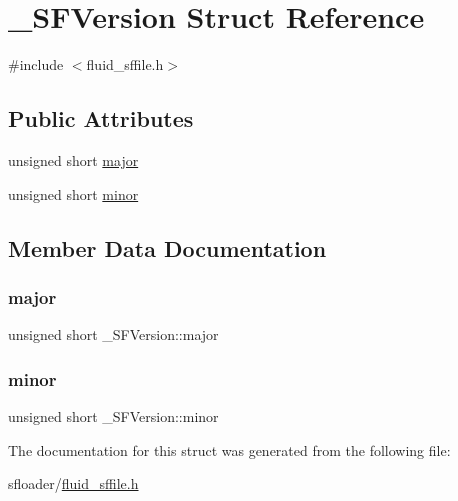 \hypertarget{struct__SFVersion}{}\section{\+\_\+\+S\+F\+Version Struct Reference}
\label{struct__SFVersion}


{\ttfamily \#include $<$fluid\+\_\+sffile.\+h$>$}

\subsection*{Public Attributes}
\begin{DoxyCompactItemize}
\item 
unsigned short \hyperlink{struct__SFVersion_a75680ec3b4b3f16cb131d8b32661723a}{major}
\item 
unsigned short \hyperlink{struct__SFVersion_afbe4dedad275a3d60e290874a5b61113}{minor}
\end{DoxyCompactItemize}


\subsection{Member Data Documentation}
\mbox{\label{struct__SFVersion_a75680ec3b4b3f16cb131d8b32661723a}} 
\subsubsection{\texorpdfstring{major}{major}}
{\footnotesize\ttfamily unsigned short \+\_\+\+S\+F\+Version\+::major}

\mbox{\label{struct__SFVersion_afbe4dedad275a3d60e290874a5b61113}} 
\subsubsection{\texorpdfstring{minor}{minor}}
{\footnotesize\ttfamily unsigned short \+\_\+\+S\+F\+Version\+::minor}



The documentation for this struct was generated from the following file\+:\begin{DoxyCompactItemize}
\item 
sfloader/\hyperlink{fluid__sffile_8h}{fluid\+\_\+sffile.\+h}\end{DoxyCompactItemize}
